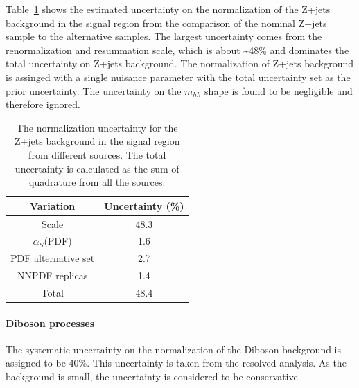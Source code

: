 Table~\ref{tab:boosted_unc_zjets} shows the estimated uncertainty on the normalization of the Z+jets background in the signal region
from the comparison of the nominal Z+jets sample to the alternative samples. The largest uncertainty comes from the renormalization
and resummation scale, which is about \textasciitilde48\% and dominates the total uncertainty on Z+jets background. The normalization of Z+jets
background is assinged with a single nuisance parameter with the total uncertainty set as the prior uncertainty. The uncertainty on the
$m_{hh}$ shape is found to be negligible and therefore ignored. %
 
\begin{table}[htbp!]
\begin{center}
\begin{tabular}{c|c}
Variation  &  Uncertainty (\%) \\
\hline
Scale               &   48.3  \\
$\alpha_{S}$(PDF)   &   1.6   \\
PDF alternative set &   2.7   \\
NNPDF replicas      &   1.4   \\
\hline
Total               &   48.4  \\
\end{tabular}
\end{center}
\caption[The normalization uncertainty for the Z+Jets background in the SR
from different sources]{The normalization uncertainty for the Z+jets background in the signal region
from different sources. The total uncertainty is calculated as the sum of quadrature from all
the sources.}
\label{tab:boosted_unc_zjets}
\end{table}
 
\FloatBarrier
\paragraph{Diboson processes}
\label{sec:boosted_syst_modeling_diboson}
The systematic uncertainty on the normalization of the Diboson background is assigned to be 40\%. This uncertainty
is taken from the resolved analysis. As the background is small, the uncertainty is considered to be conservative.
 
